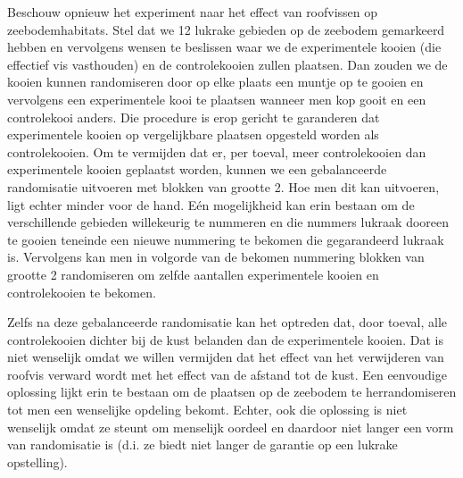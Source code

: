 \documentclass[
  12pt,dutch,coursenotes]{book}
\theoremstyle{definition}
\theoremstyle{definition}
\theoremstyle{definition}
\theoremstyle{remark}
\begin{document}
Beschouw opnieuw het experiment naar het effect van roofvissen op zeebodemhabitats. Stel dat we 12 lukrake gebieden op de zeebodem gemarkeerd hebben en vervolgens wensen te beslissen waar we de experimentele kooien (die effectief vis vasthouden) en de controlekooien zullen plaatsen. Dan zouden we de kooien kunnen randomiseren door op elke plaats een muntje op te gooien en vervolgens een experimentele kooi te plaatsen wanneer men kop gooit en een controlekooi anders. Die procedure is erop gericht te garanderen dat experimentele kooien op vergelijkbare plaatsen opgesteld worden als controlekooien. Om te vermijden dat er, per toeval, meer controlekooien dan experimentele kooien geplaatst worden, kunnen we een gebalanceerde randomisatie uitvoeren met blokken van grootte 2. Hoe men dit kan uitvoeren, ligt echter minder voor de hand. Eén mogelijkheid kan erin bestaan om de verschillende gebieden willekeurig te nummeren en die nummers lukraak dooreen te gooien teneinde een nieuwe nummering te bekomen die gegarandeerd lukraak is. Vervolgens kan men in volgorde van de bekomen nummering blokken van grootte 2 randomiseren om zelfde aantallen experimentele kooien en controlekooien te bekomen.

Zelfs na deze gebalanceerde randomisatie kan het optreden dat, door toeval, alle controlekooien dichter bij de kust belanden dan de experimentele kooien. Dat is niet wenselijk omdat we willen vermijden dat het effect van het verwijderen van roofvis verward wordt met het effect van de afstand tot de kust. Een eenvoudige oplossing lijkt erin te bestaan om de plaatsen op de zeebodem te herrandomiseren tot men een wenselijke opdeling bekomt. Echter, ook die oplossing is niet wenselijk omdat ze steunt om menselijk oordeel en daardoor niet langer een vorm van randomisatie is (d.i. ze biedt niet langer de garantie op een lukrake opstelling).
\end{document}
